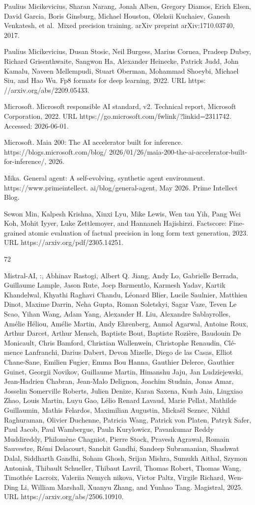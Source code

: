 \documentclass[
  10
]{article}
\begin{document}
Paulius Micikevicius, Sharan Narang, Jonah Alben, Gregory Diamos, Erich
Elsen, David Garcia, Boris Ginsburg, Michael Houston, Oleksii Kuchaiev,
Ganesh Venkatesh, et al.~Mixed precision training. arXiv preprint
arXiv:1710.03740, 2017.

Paulius Micikevicius, Dusan Stosic, Neil Burgess, Marius Cornea, Pradeep
Dubey, Richard Grisenthwaite, Sangwon Ha, Alexander Heinecke, Patrick
Judd, John Kamalu, Naveen Mellempudi, Stuart Oberman, Mohammad Shoeybi,
Michael Siu, and Hao Wu. Fp8 formats for deep learning, 2022. URL https:
//arxiv.org/abs/2209.05433.

Microsoft. Microsoft responsible AI standard, v2. Technical report,
Microsoft Corporation, 2022. URL
https://go.microsoft.com/fwlink/?linkid=2311742. Accessed: 2026-06-01.

Microsoft. Maia 200: The AI accelerator built for inference.
https://blogs.microsoft.com/blog/
2026/01/26/maia-200-the-ai-accelerator-built-for-inference/, 2026.

Mika. General agent: A self-evolving, synthetic agent environment.
https://www.primeintellect. ai/blog/general-agent, May 2026. Prime
Intellect Blog.

Sewon Min, Kalpesh Krishna, Xinxi Lyu, Mike Lewis, Wen tau Yih, Pang Wei
Koh, Mohit Iyyer, Luke Zettlemoyer, and Hannaneh Hajishirzi. Factscore:
Fine-grained atomic evaluation of factual precision in long form text
generation, 2023. URL https://arxiv.org/pdf/2305.14251.

72

Mistral-AI, :, Abhinav Rastogi, Albert Q. Jiang, Andy Lo, Gabrielle
Berrada, Guillaume Lample, Jason Rute, Joep Barmentlo, Karmesh Yadav,
Kartik Khandelwal, Khyathi Raghavi Chandu, Léonard Blier, Lucile
Saulnier, Matthieu Dinot, Maxime Darrin, Neha Gupta, Roman Soletskyi,
Sagar Vaze, Teven Le Scao, Yihan Wang, Adam Yang, Alexander H. Liu,
Alexandre Sablayrolles, Amélie Héliou, Amélie Martin, Andy Ehrenberg,
Anmol Agarwal, Antoine Roux, Arthur Darcet, Arthur Mensch, Baptiste
Bout, Baptiste Rozière, Baudouin De Monicault, Chris Bamford, Christian
Wallenwein, Christophe Renaudin, Clé- mence Lanfranchi, Darius Dabert,
Devon Mizelle, Diego de las Casas, Elliot Chane-Sane, Emilien Fugier,
Emma Bou Hanna, Gauthier Delerce, Gauthier Guinet, Georgii Novikov,
Guillaume Martin, Himanshu Jaju, Jan Ludziejewski, Jean-Hadrien Chabran,
Jean-Malo Delignon, Joachim Studnia, Jonas Amar, Josselin Somerville
Roberts, Julien Denize, Karan Saxena, Kush Jain, Lingxiao Zhao, Louis
Martin, Luyu Gao, Lélio Renard Lavaud, Marie Pellat, Mathilde
Guillaumin, Mathis Felardos, Maximilian Augustin, Mickaël Seznec, Nikhil
Raghuraman, Olivier Duchenne, Patricia Wang, Patrick von Platen, Patryk
Safer, Paul Jacob, Paul Wambergue, Paula Kurylowicz, Pavankumar Reddy
Muddireddy, Philomène Chagniot, Pierre Stock, Pravesh Agrawal, Romain
Sauvestre, Rémi Delacourt, Sanchit Gandhi, Sandeep Subramanian, Shashwat
Dalal, Siddharth Gandhi, Soham Ghosh, Srijan Mishra, Sumukh Aithal,
Szymon Antoniak, Thibault Schueller, Thibaut Lavril, Thomas Robert,
Thomas Wang, Timothée Lacroix, Valeriia Nemych nikova, Victor Paltz,
Virgile Richard, Wen-Ding Li, William Marshall, Xuanyu Zhang, and Yunhao
Tang. Magistral, 2025. URL https://arxiv.org/abs/2506.10910.
\end{document}
